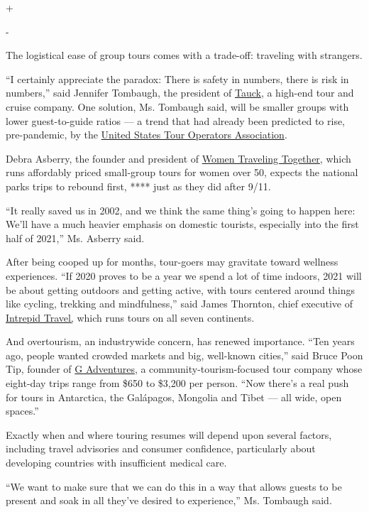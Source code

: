 +

-

The logistical ease of group tours comes with a trade-off: traveling
with strangers.

``I certainly appreciate the paradox: There is safety in numbers, there
is risk in numbers,'' said Jennifer Tombaugh, the president of
\href{https://www.tauck.com/}{Tauck}, a high-end tour and cruise
company. One solution, Ms. Tombaugh said, will be smaller groups with
lower guest-to-guide ratios --- a trend that had already been predicted
to rise, pre-pandemic, by the \href{https://ustoa.com/}{United States
Tour Operators Association}.

Debra Asberry, the founder and president of
\href{https://www.women-traveling.com/}{Women Traveling Together}, which
runs affordably priced small-group tours for women over 50, expects the
national parks trips to rebound first, **** just as they did after 9/11.

``It really saved us in 2002, and we think the same thing's going to
happen here: We'll have a much heavier emphasis on domestic tourists,
especially into the first half of 2021,'' Ms. Asberry said.

After being cooped up for months, tour-goers may gravitate toward
wellness experiences. ``If 2020 proves to be a year we spend a lot of
time indoors, 2021 will be about getting outdoors and getting active,
with tours centered around things like cycling, trekking and
mindfulness,'' said James Thornton, chief executive of
\href{https://www.intrepidtravel.com/}{Intrepid Travel,} which runs
tours on all seven continents.

And overtourism, an industrywide concern, has renewed importance. ``Ten
years ago, people wanted crowded markets and big, well-known cities,''
said Bruce Poon Tip, founder of \href{https://www.gadventures.com/}{G
Adventures}, a community-tourism-focused tour company whose eight-day
trips range from \$650 to \$3,200 per person. ``Now there's a real push
for tours in Antarctica, the Galápagos, Mongolia and Tibet --- all wide,
open spaces.''

Exactly when and where touring resumes will depend upon several factors,
including travel advisories and consumer confidence, particularly about
developing countries with insufficient medical care.

``We want to make sure that we can do this in a way that allows guests
to be present and soak in all they've desired to experience,'' Ms.
Tombaugh said.

